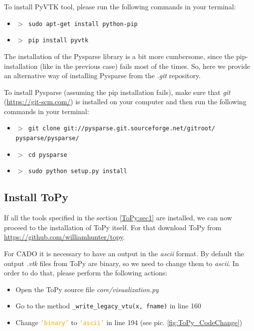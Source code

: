 \documentclass[
12pt, %
a4paper, %
oneside, %
headinclude,footinclude, %
BCOR5mm, %
]{scrartcl}
\begin{document}
	To install PyVTK tool, please run the following commands in your terminal:
\begin{itemize}
\item[] \texttt{\textbf{$>$ }sudo apt-get install python-pip}
\item[] \texttt{\textbf{$>$ }pip install pyvtk}
\end{itemize}
	
	The installation of the Pysparse library is a bit more cumbersome, since the pip-installation (like in the previous case) fails most of the times. So, here we provide an alternative way of installing Pysparse from the \textit{.git} repository.
	
	To install Pysparse (assuming the pip installation fails), make sure that \textit{git} (\href{https://git-scm.com/}{https://git-scm.com/}) is installed on your computer and then run the following commands in your terminal:
\begin{itemize}
\item[] \texttt{\textbf{$>$ }git clone git://pysparse.git.sourceforge.net/gitroot/ \\ pysparse/pysparse/}
\item[] \texttt{\textbf{$>$ }cd pysparse}
\item[] \texttt{\textbf{$>$ }sudo python setup.py install}
\end{itemize}
%	
\subsection{Install ToPy}
	If all the tools specified in the section \ref{ToPy:sec1} are installed, we can now proceed to the installation of ToPy itself. For that download ToPy from \href{https://github.com/williamhunter/topy}{https://github.com/williamhunter/topy}. 

For CADO it is necessary to have an output in the \textit{ascii} format. By default the output \textit{.vtk} files from ToPy are binary, so we need to change them to \textit{ascii}. In order to do that, please perform the following actions:
\begin{itemize}
 		\item Open the ToPy source file \textit{core/visualization.py}
 		\item Go to the method \texttt{{\_}write{\_}legacy{\_}vtu(x, fname)} in line 160

 		\item Change \textcolor{orange}{\texttt{'binary'}} to \textcolor{orange}{\texttt{'ascii'}} in line 194 (see pic. \ref{fig:ToPy_CodeChange})
\end{itemize} 
	
\end{document}
